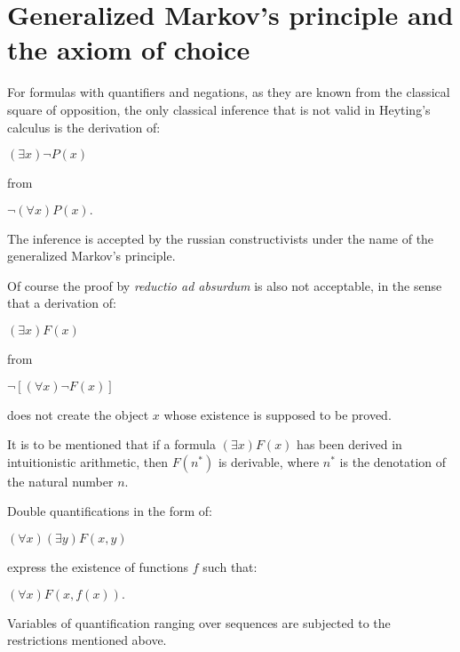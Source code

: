 \documentclass[12pt]{article}
\begin{document}
\section{Generalized Markov's principle and the axiom of choice}\normalsize

For formulas with quantifiers and negations, as they are known from the classical square of opposition, the only classical inference that is not  valid in Heyting's calculus is the derivation of:

\begin{center} 
$(\exists x) \neg P (x)$
\end{center}

from          

\begin{center}
$\neg (\forall x) P (x).$
\end{center}

The inference is accepted by the russian constructivists under the name of the generalized Markov's principle. 

Of course the proof by \emph{reductio ad absurdum} is also not acceptable, in the sense that a derivation of:

\begin{center}
$(\exists x) F (x)$
\end{center}

from                     

\begin{center}
$\neg [(\forall x) \neg F (x)]$
\end{center}

does not create the object $x$ whose existence is supposed to be proved.

It is to be mentioned that if a formula $(\exists x) F (x)$ has been derived in intuitionistic arithmetic, then $F (n^*)$ is derivable, where $n^*$ is the denotation of the natural number $n$.

Double quantifications in the form of:

\begin{center}
$(\forall x) (\exists y) F (x, y)$
\end{center}
 
express the existence of functions $f$ such that:

\begin{center}
$(\forall x) F (x, f (x)).$ 
\end{center}

Variables of quantification ranging over sequences are subjected to the restrictions mentioned above.
\end{document}
